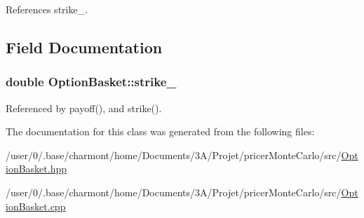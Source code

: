 References strike\-\_\-.



\subsection{Field Documentation}
\hypertarget{classOptionBasket_a577ab909d0049dd2036b6751f64f93f4}{
\subsubsection[{strike\-\_\-}]{\setlength{\rightskip}{0pt plus 5cm}double Option\-Basket\-::strike\-\_\-\hspace{0.3cm}{\ttfamily [protected]}}}\label{classOptionBasket_a577ab909d0049dd2036b6751f64f93f4}


Referenced by payoff(), and strike().



The documentation for this class was generated from the following files\-:\begin{DoxyCompactItemize}
\item 
/user/0/.\-base/charmont/home/\-Documents/3\-A/\-Projet/pricer\-Monte\-Carlo/src/\hyperlink{OptionBasket_8hpp}{Option\-Basket.\-hpp}\item 
/user/0/.\-base/charmont/home/\-Documents/3\-A/\-Projet/pricer\-Monte\-Carlo/src/\hyperlink{OptionBasket_8cpp}{Option\-Basket.\-cpp}\end{DoxyCompactItemize}
